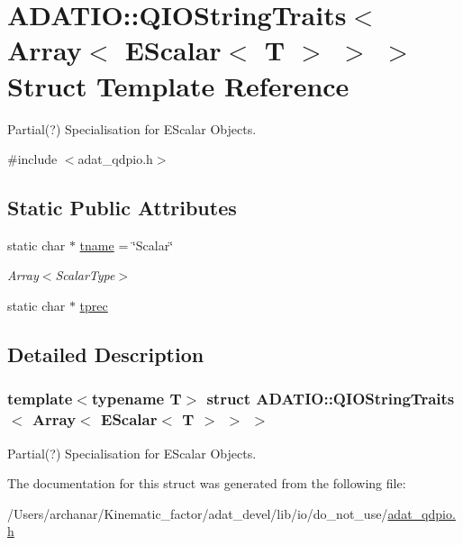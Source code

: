 \hypertarget{structADATIO_1_1QIOStringTraits_3_01Array_3_01EScalar_3_01T_01_4_01_4_01_4}{}\section{A\+D\+A\+T\+IO\+:\+:Q\+I\+O\+String\+Traits$<$ Array$<$ E\+Scalar$<$ T $>$ $>$ $>$ Struct Template Reference}
\label{structADATIO_1_1QIOStringTraits_3_01Array_3_01EScalar_3_01T_01_4_01_4_01_4}


Partial(?) Specialisation for E\+Scalar Objects.  




{\ttfamily \#include $<$adat\+\_\+qdpio.\+h$>$}

\subsection*{Static Public Attributes}
\begin{DoxyCompactItemize}
\item 
static char $\ast$ \mbox{\hyperlink{group__qio_gab84af1dfbd36e1ce7eebd1603b371727}{tname}} = \char`\"{}Scalar\char`\"{}
\begin{DoxyCompactList}\small\item\em Array$<$\+Scalar\+Type$>$ \end{DoxyCompactList}\item 
static char $\ast$ \mbox{\hyperlink{group__qio_ga7ca53c00705c98636d0eb04347851f07}{tprec}}
\end{DoxyCompactItemize}


\subsection{Detailed Description}
\subsubsection*{template$<$typename T$>$\newline
struct A\+D\+A\+T\+I\+O\+::\+Q\+I\+O\+String\+Traits$<$ Array$<$ E\+Scalar$<$ T $>$ $>$ $>$}

Partial(?) Specialisation for E\+Scalar Objects. 

The documentation for this struct was generated from the following file\+:\begin{DoxyCompactItemize}
\item 
/\+Users/archanar/\+Kinematic\+\_\+factor/adat\+\_\+devel/lib/io/do\+\_\+not\+\_\+use/\mbox{\hyperlink{adat__qdpio_8h}{adat\+\_\+qdpio.\+h}}\end{DoxyCompactItemize}
